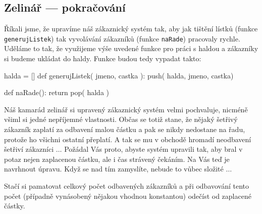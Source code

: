 

\subsection*{Zelinář --- pokračování} 

Říkali jsme, že upravíme náš zákaznický systém tak, aby jak tištění lístků (funkce {\tt generujListek}) tak vyvolávání zákazníků
(funkce {\tt naRade}) pracovaly rychle. Uděláme to tak, že využijeme výše uvedené funkce pro práci s haldou a zákazníky si budeme
ukládat do haldy. Funkce budou tedy vypadat takto:

\begin{python}
halda = []
def generujListek( jmeno, castka ):
  push( halda, jmeno, castka)

def naRade():
  return pop( halda ) 
\end{python}

\begin{cviceni} Náš kamarád zelinář si upravený zákaznický systém velmi pochvaluje, nicméně všiml si jedné nepříjemné vlastnosti.
Občas se totiž stane, že nějaký šetřivý zákazník zaplatí za odbavení malou částku a pak se nikdy nedostane na řadu, protože ho
všichni ostatní přeplatí. A tak se mu v obchodě hromadí neodbavení šetřiví zákazníci $\ldots$ Požádal Vás proto, abyste systém
upravili tak, aby bral v potaz nejen zaplacenou částku, ale i čas strávený čekáním. Na Vás teď je navrhnout úpravu. Když se nad
tím zamyslíte, nebude to vůbec složité $\ldots$
\end{cviceni}

\begin{reseni}
Stačí si pamatovat celkový počet odbavených zákazníků a při odbavování tento počet (případně vynásobený nějakou vhodnou konstantou)
odečíst od zaplacené částky. 
\end{reseni}

\ifx\ucebnice\undefined

\fi